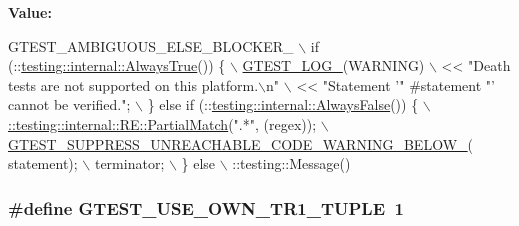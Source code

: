 {\bfseries Value\-:}
\begin{DoxyCode}
GTEST\_AMBIGUOUS\_ELSE\_BLOCKER\_ \(\backslash\)
    if (::\hyperlink{namespacetesting_1_1internal_a922c9da63cd4bf94fc473b9ecac76414}{testing::internal::AlwaysTrue}()) \{ \hyperlink{fused-src_2gtest_2gtest_8h_a8ef4cb4c465db8c15464aecc6d9510ef}{\(\backslash\)}
\hyperlink{fused-src_2gtest_2gtest_8h_a8ef4cb4c465db8c15464aecc6d9510ef}{      GTEST\_LOG\_}(WARNING) \(\backslash\)
          << \textcolor{stringliteral}{"Death tests are not supported on this platform.\(\backslash\)n"} \(\backslash\)
          << \textcolor{stringliteral}{"Statement '"} #statement \textcolor{stringliteral}{"' cannot be verified."}; \(\backslash\)
    \} \textcolor{keywordflow}{else} \textcolor{keywordflow}{if} (::\hyperlink{namespacetesting_1_1internal_a4b24c851ab13569b1b15b3d259b60d2e}{testing::internal::AlwaysFalse}()) \{ 
      \hyperlink{classtesting_1_1internal_1_1_r_e_a1e81f9a87211bdca645e025f8f0236c8}{\(\backslash\)}
\hyperlink{classtesting_1_1internal_1_1_r_e_a1e81f9a87211bdca645e025f8f0236c8}{      ::testing::internal::RE::PartialMatch}(\textcolor{stringliteral}{".*"}, (regex)); 
      \hyperlink{fused-src_2gtest_2gtest_8h_a2e66f7dfc5cb87e0fa0289f653173c69}{\(\backslash\)}
\hyperlink{fused-src_2gtest_2gtest_8h_a2e66f7dfc5cb87e0fa0289f653173c69}{      GTEST\_SUPPRESS\_UNREACHABLE\_CODE\_WARNING\_BELOW\_}(
      statement); \(\backslash\)
      terminator; \(\backslash\)
    \} else \(\backslash\)
      ::testing::Message()
\end{DoxyCode}
\hypertarget{fused-src_2gtest_2gtest_8h_afa144e5f5d039db0df873e7ad48c1fda}{
\subsubsection[{G\-T\-E\-S\-T\-\_\-\-U\-S\-E\-\_\-\-O\-W\-N\-\_\-\-T\-R1\-\_\-\-T\-U\-P\-L\-E}]{\setlength{\rightskip}{0pt plus 5cm}\#define G\-T\-E\-S\-T\-\_\-\-U\-S\-E\-\_\-\-O\-W\-N\-\_\-\-T\-R1\-\_\-\-T\-U\-P\-L\-E~1}}\label{fused-src_2gtest_2gtest_8h_afa144e5f5d039db0df873e7ad48c1fda}
